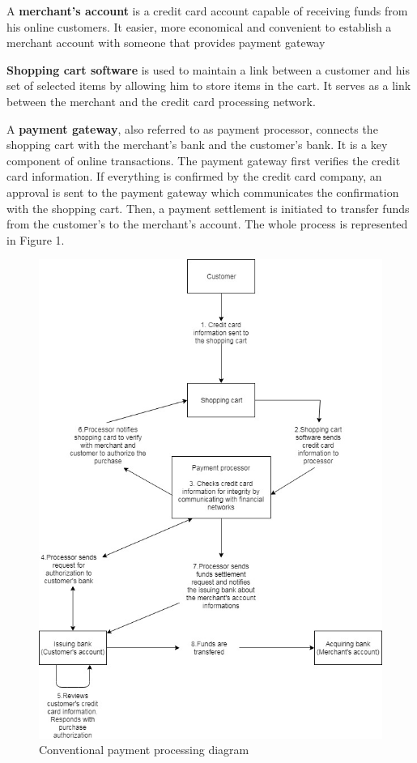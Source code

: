 \documentclass{ferseminar}
\begin{document}
A \textbf{merchant's account} is a credit card account capable of receiving funds from his online customers. It easier, more economical and convenient to establish a merchant account with someone that provides payment gateway

\textbf{Shopping cart software} is used to maintain a link between a customer and his set of selected items by allowing him to store items in the cart. It serves as a link between the merchant and the credit card processing network.

A \textbf{payment gateway}, also referred to as payment processor, connects the shopping cart with the merchant's bank and the customer's bank. It is a key component of online transactions. The payment gateway first verifies the credit card information. If everything is confirmed by the credit card company, an approval is sent to the payment gateway which communicates the confirmation with the shopping cart. Then, a payment settlement is initiated to transfer funds from the customer's to the merchant's account. The whole process is represented in Figure 1.
\begin{figure}[p]
	\caption{Conventional payment processing diagram}
	\includegraphics[scale=0.7]{diagram1}
	\centering
\end{figure}
\end{document}
